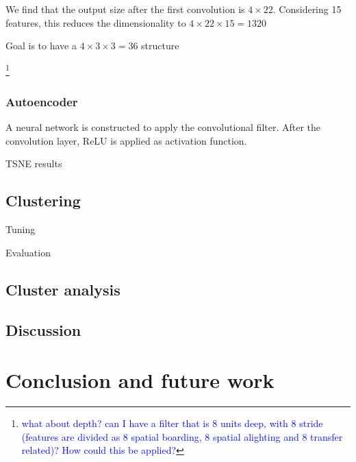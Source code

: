 \documentclass{article}
\newcommand{\technicalDoubt}[1]{\footnote{\textcolor{blue}{#1}}}
\begin{document}
We find that the output size after the first convolution is $4 \times 22$. Considering 15 features, this reduces the dimensionality to $4 \times 22 \times 15 = 1320$

Goal is to have a $ 4 \times 3 \times 3 = 36$ structure

\technicalDoubt{what about depth? can I have a filter that is 8 units deep, with 8 stride (features are divided as 8 spatial boarding, 8 spatial alighting and 8 transfer related)? How could this be applied?}

\subsubsection{Autoencoder}
A neural network is constructed to apply the convolutional filter. After the convolution layer, ReLU is applied as activation function. 

TSNE results 

\subsection{Clustering}
Tuning

Evaluation

\subsection{Cluster analysis}

\subsection{Discussion}


\newpage
\section{Conclusion and future work}

\newpage
{}

\end{document}
